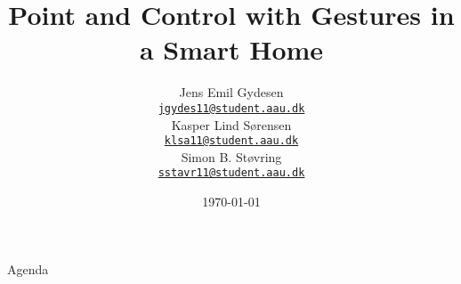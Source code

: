 \documentclass[10pt]{beamer}
\title{Point and Control with Gestures in a Smart Home}
\date{\today}
\author{
  Jens Emil Gydesen\\ \href{mailto:jgydes11@student.aau.dk}{{\tt jgydes11@student.aau.dk}}\\
  Kasper Lind Sørensen\\  \href{mailto:klsa11@student.aau.dk}{{\tt klsa11@student.aau.dk}}\\
  Simon B. Støvring\\ \href{mailto:sstavr11@student.aau.dk}{{\tt sstavr11@student.aau.dk}}
}
\institute[
  Dept.\ of Computer Science\\
  Aalborg University\\
  Denmark
] %
{%
  Department of Computer Science\\
  Aalborg University\\
  Denmark
  
}
\begin{document}
{\aauwavesbg%
\begin{frame} %
  \titlepage
\end{frame}}

\begin{frame}{Agenda}{}
\tableofcontents
\end{frame}










\end{document}
